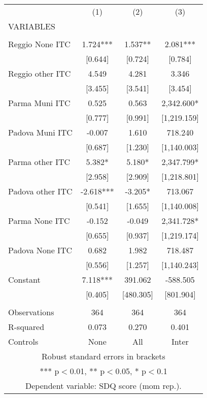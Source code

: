 \begin{tabular}{lccc} \hline
 & (1) & (2) & (3) \\
VARIABLES &  &  &  \\ \hline
 &  &  &  \\
Reggio None ITC & 1.724*** & 1.537** & 2.081*** \\
 & [0.644] & [0.724] & [0.784] \\
Reggio other ITC & 4.549 & 4.281 & 3.346 \\
 & [3.455] & [3.541] & [3.454] \\
Parma Muni ITC & 0.525 & 0.563 & 2,342.600* \\
 & [0.777] & [0.991] & [1,219.159] \\
Padova Muni ITC & -0.007 & 1.610 & 718.240 \\
 & [0.687] & [1.230] & [1,140.003] \\
Parma other ITC & 5.382* & 5.180* & 2,347.799* \\
 & [2.958] & [2.909] & [1,218.801] \\
Padova other ITC & -2.618*** & -3.205* & 713.067 \\
 & [0.541] & [1.655] & [1,140.008] \\
Parma None ITC & -0.152 & -0.049 & 2,341.728* \\
 & [0.655] & [0.937] & [1,219.174] \\
Padova None ITC & 0.682 & 1.982 & 718.487 \\
 & [0.556] & [1.257] & [1,140.243] \\
Constant & 7.118*** & 391.062 & -588.505 \\
 & [0.405] & [480.305] & [801.904] \\
 &  &  &  \\
Observations & 364 & 364 & 364 \\
R-squared & 0.073 & 0.270 & 0.401 \\
 Controls & None & All & Inter \\ \hline
\multicolumn{4}{c}{ Robust standard errors in brackets} \\
\multicolumn{4}{c}{ *** p$<$0.01, ** p$<$0.05, * p$<$0.1} \\
\multicolumn{4}{c}{ Dependent variable: SDQ score (mom rep.).} \\
\end{tabular}
